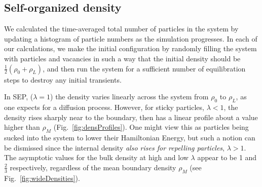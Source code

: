\documentclass[
reprint, amsmath,amssymb,
]{revtex4-1}
\begin{document}
\subsection{Self-organized density}


We calculated the time-averaged total number of particles in
the system by updating a histogram of particle numbers
as the simulation progresses. In each of our calculations, we make the
initial configuration by randomly filling the system with particles
and vacancies in such a way that the initial density should be
$\frac{1}{2}(\rho_0 + \rho_L)$, and then run the system for a
sufficient number of equilibration steps to destroy any initial
transients.

In SEP, ($\lambda=1$) the density varies linearly across the system
from $\rho_0$ to $\rho_L$, as one expects for a diffusion process.
However, for sticky particles, $\lambda<1$, the density rises sharply
near to the boundary, then has a linear profile about a value higher
than $\rho_M$  (Fig.~\ref{fig:densProfiles}). 
One might view this as particles being sucked into the
system to lower their Hamiltonian Energy, but such a notion can be
dismissed since the internal density {\it also rises for repelling
  particles}, $\lambda>1$.  The asymptotic values for the bulk density at
high and low $\lambda$ appear to be 1 and $\frac{2}{3}$ respectively, regardless of the 
mean boundary density $\rho_M$ (see Fig.~\ref{fig:wideDensities}). 
\end{document}

